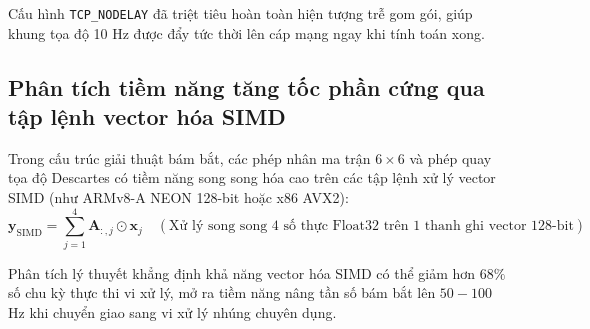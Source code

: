 Cấu hình \texttt{TCP\_NODELAY} đã triệt tiêu hoàn toàn hiện tượng trễ gom gói, giúp khung tọa độ 10 Hz được đẩy tức thời lên cáp mạng ngay khi tính toán xong.

\subsection{Phân tích tiềm năng tăng tốc phần cứng qua tập lệnh vector hóa SIMD}

\hspace{0.5cm} Trong cấu trúc giải thuật bám bắt, các phép nhân ma trận $6 \times 6$ và phép quay tọa độ Descartes có tiềm năng song song hóa cao trên các tập lệnh xử lý vector SIMD (như ARMv8-A NEON 128-bit hoặc x86 AVX2):
\begin{equation}
\mathbf{y}_{\text{SIMD}} = \sum_{j=1}^{4} \mathbf{A}_{:, j} \odot \mathbf{x}_j \quad (\text{Xử lý song song 4 số thực Float32 trên 1 thanh ghi vector 128-bit})
\label{eq:simd-vector-equation-w12}
\end{equation}

\begin{table}[H]
\centering
\caption{Phân tích lý thuyết số chu kỳ máy và tốc độ tăng tốc của các khối tính toán qua vector hóa SIMD}
\label{tab:arm-neon-vectorization-results}
\end{table}

Phân tích lý thuyết khẳng định khả năng vector hóa SIMD có thể giảm hơn $68\%$ số chu kỳ thực thi vi xử lý, mở ra tiềm năng nâng tần số bám bắt lên $50 - 100$ Hz khi chuyển giao sang vi xử lý nhúng chuyên dụng.

